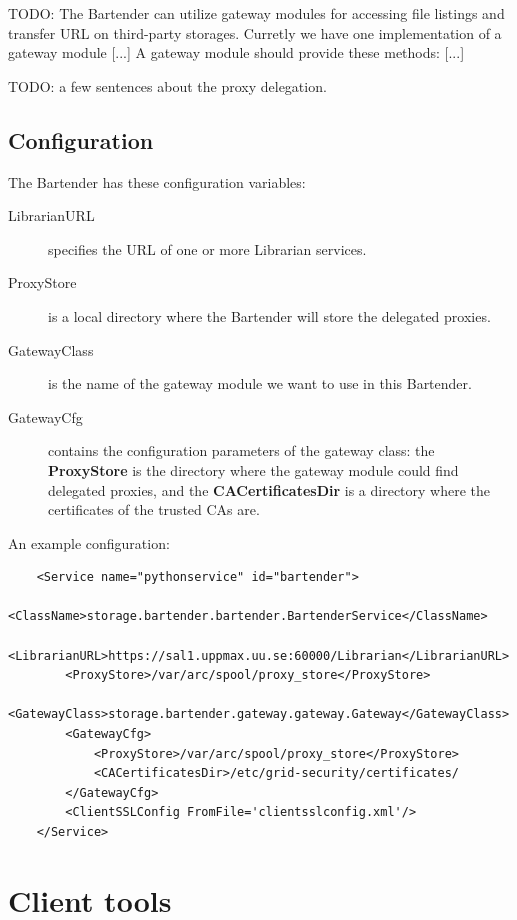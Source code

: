 \documentclass{book}
\begin{document}
TODO: The Bartender can utilize gateway modules for accessing file listings and transfer URL on third-party storages. Curretly we have one implementation of a gateway module [...] A gateway module should provide these methods: [...] 

TODO: a few sentences about the proxy delegation.


\subsection{Configuration} %

The Bartender has these configuration variables:

\begin{description}
    \item[LibrarianURL] specifies the URL of one or more Librarian services.
    \item[ProxyStore] is a local directory where the Bartender will store the delegated proxies.
    \item[GatewayClass] is the name of the gateway module we want to use in this Bartender.
    \item[GatewayCfg] contains the configuration parameters of the gateway class: the \textbf{ProxyStore} is the directory where the gateway module could find delegated proxies, and the \textbf{CACertificatesDir} is a directory where the certificates of the trusted CAs are. 
\end{description}

An example configuration:

\begin{verbatim}
    <Service name="pythonservice" id="bartender">
        <ClassName>storage.bartender.bartender.BartenderService</ClassName>
        <LibrarianURL>https://sal1.uppmax.uu.se:60000/Librarian</LibrarianURL>
        <ProxyStore>/var/arc/spool/proxy_store</ProxyStore>
        <GatewayClass>storage.bartender.gateway.gateway.Gateway</GatewayClass>
        <GatewayCfg>
            <ProxyStore>/var/arc/spool/proxy_store</ProxyStore>
            <CACertificatesDir>/etc/grid-security/certificates/
        </GatewayCfg>
        <ClientSSLConfig FromFile='clientsslconfig.xml'/>
    </Service>
\end{verbatim}


\newpage

\section{Client tools} %
\label{sec:client_tools}
\end{document}
